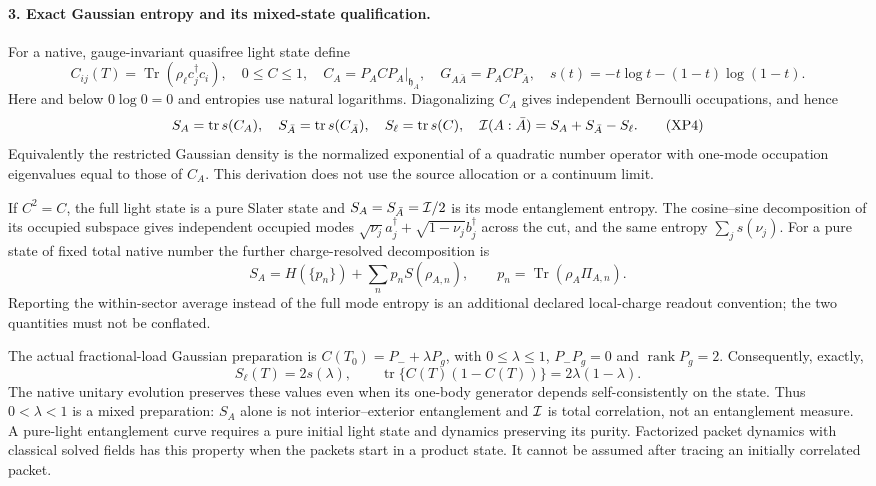 \documentclass[11pt]{article}
\DeclareMathOperator{\Tr}{Tr}
\DeclareMathOperator{\tr}{tr}
\begin{document}
\paragraph{3. Exact Gaussian entropy and its mixed-state qualification.}
For a native, gauge-invariant quasifree light state define
\begin{equation}
 C_{ij}(T)=\Tr(\rho_\ell c_j^\dagger c_i),\quad
 0\leq C\leq1,\quad
 C_A=P_A C P_A\big|_{\mathfrak h_A},\quad
 G_{A\bar A}=P_A C P_{\bar A},\quad
 s(t)=-t\log t-(1-t)\log(1-t).
 \tag{XP3}
\end{equation}
Here and below $0\log0=0$ and entropies use natural logarithms.
Diagonalizing $C_A$ gives independent Bernoulli occupations,
and hence
\begin{equation}
 S_A=\tr s(C_A),\quad S_{\bar A}=\tr s(C_{\bar A}),\quad
 S_\ell=\tr s(C),\quad
 {\cal I}(A:\bar A)=S_A+S_{\bar A}-S_\ell .
 \tag{XP4}
\end{equation}
Equivalently the restricted Gaussian density is the normalized
exponential of a quadratic number operator with one-mode
occupation eigenvalues equal to those of $C_A$.  This derivation
does not use the source allocation or a continuum limit.

If $C^2=C$, the full light state is a pure Slater state and
$S_A=S_{\bar A}={\cal I}/2$ is its mode entanglement entropy.
The cosine--sine decomposition of its occupied subspace gives
independent occupied modes
$\sqrt{\nu_j}a_j^\dagger+\sqrt{1-\nu_j}b_j^\dagger$ across the cut,
and the same entropy $\sum_j s(\nu_j)$.
For a pure state of fixed total native number the further
charge-resolved decomposition is
\[
 S_A=H(\{p_n\})+\sum_n p_n S(\rho_{A,n}),\qquad
 p_n=\Tr(\rho_A\Pi_{A,n}).
\]
Reporting the within-sector average instead of the full mode
entropy is an additional declared local-charge readout convention;
the two quantities must not be conflated.

The actual fractional-load Gaussian preparation is
$C(T_0)=P_-+\lambda P_g$, with $0\leq\lambda\leq1$,
$P_-P_g=0$ and
$\operatorname{rank}P_g=2$.  Consequently, exactly,
\begin{equation}
 S_\ell(T)=2s(\lambda),\qquad
 \tr\{C(T)(1-C(T))\}=2\lambda(1-\lambda).
 \tag{XP5}
\end{equation}
The native unitary evolution preserves these values even when
its one-body generator depends self-consistently on the state.
Thus $0<\lambda<1$ is a mixed preparation: $S_A$ alone is not
interior--exterior entanglement and ${\cal I}$ is total correlation,
not an entanglement measure.  A pure-light entanglement curve
requires a pure initial light state and dynamics preserving its
purity.  Factorized packet dynamics with classical solved fields
has this property when the packets start in a product state.
It cannot be assumed after tracing an initially correlated packet.
\end{document}
